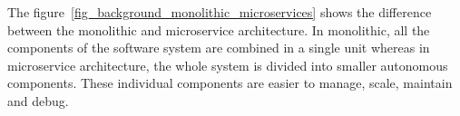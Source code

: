 The figure~\ref{fig_background_monolithic_microservices} shows the difference between the monolithic and microservice architecture. In monolithic, all the components of the software system are combined in a single unit whereas in microservice architecture, the whole system is divided into smaller autonomous components. These individual components are easier to manage, scale, maintain and debug.